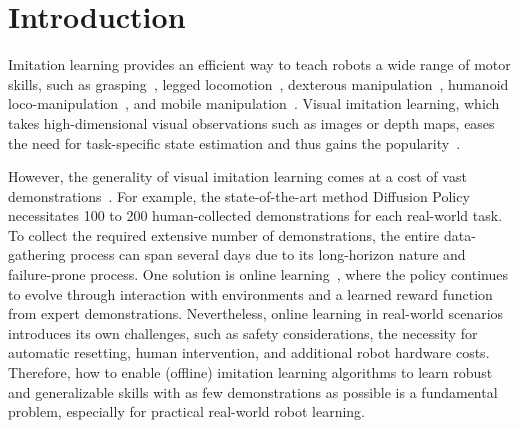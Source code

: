\section{Introduction}


Imitation learning provides an efficient way to teach robots a wide range of motor skills, such as grasping~\citep{wang2023mimicplay,shridhar2023peract,ze2023gnfactor}, legged locomotion~\cite{peng2020imitating_animal}, dexterous manipulation~\citep{agarwal2023functional,haldar2023fish}, humanoid loco-manipulation~\citep{seo2023humanoid}, and mobile manipulation~\citep{shafiullah2023bringing,fu2024mobile}. Visual imitation learning, which takes high-dimensional visual observations such as images or depth maps, eases the need for task-specific state estimation and thus gains the popularity~\citep{chi2023diffusion_policy,shridhar2023peract,ze2023gnfactor,florence2022ibc,hansen2022lfs}. 


However, the generality of visual imitation learning comes at a cost of vast demonstrations~\citep{haldar2023fish,chi2023diffusion_policy,florence2022ibc}.
For example, the state-of-the-art method Diffusion Policy~\citep{chi2023diffusion_policy} necessitates 100 to 200 human-collected demonstrations for each real-world task. To collect the required extensive number of demonstrations, the entire data-gathering process can span several days due to its long-horizon nature and failure-prone process. 
One solution is online learning~\citep{haldar2023fish}, where the policy continues to evolve through interaction with environments and a learned reward function from expert demonstrations. Nevertheless, online learning in real-world scenarios introduces its own challenges, such as safety considerations, the necessity for automatic resetting, human intervention, and additional robot hardware costs. Therefore, how to enable (offline) imitation learning algorithms to learn robust and generalizable skills with as few demonstrations as possible is a fundamental problem, especially for practical real-world robot learning.



